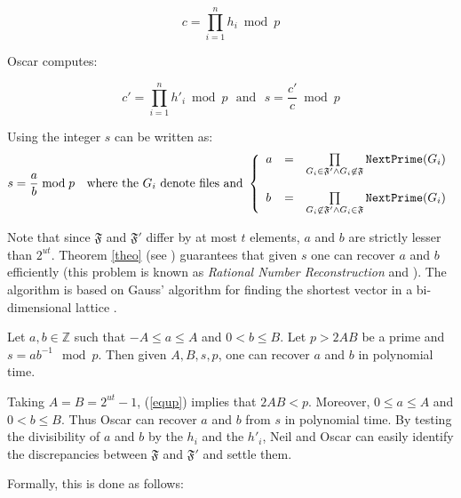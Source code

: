 \documentclass[11pt]{llncs}
\begin{document}
$$
c=\prod_{i=1}^n h_i \bmod p
$$

Oscar computes:\smallskip

$$c'=\prod_{i=1}^n h'_i \bmod p{~~~\mbox{and}~~~}s=\frac{c'}{c} \bmod p$$

Using \cite{vallee} the integer $s$ can be written as:
$$s=\frac{a}{b} \bmod p{~~~\mbox{where the~}G_i\mbox{~denote files and~}}
\left\{
\begin{array}{lcr}
a & =&  \prod\limits_{G_i \in \mathfrak{F}'\wedge G_i \not\in\mathfrak{F}} \mbox{{\tt NextPrime}}(G_i) \\
\\
b & = & \prod\limits_{G_i \not\in\mathfrak{F}' \wedge G_i \in\mathfrak{F}} \mbox{{\tt NextPrime}}(G_i)
\end{array}
\right.
$$

Note that since $\mathfrak{F}$ and $\mathfrak{F}'$ differ by at most $t$ elements, $a$ and $b$ are strictly lesser than $2^{ut}$. Theorem \ref{theo} (see \cite{cryptorational}) guarantees that given $s$ one can recover $a$ and $b$ efficiently (this problem is known as {\sl Rational Number Reconstruction} \cite{pan2004rational} and \cite{wang2003acceleration}). The algorithm is based on Gauss' algorithm for finding the shortest vector in a bi-dimensional lattice \cite{vallee}.

\begin{theorem}
\label{theo}
Let $a,b \in {\mathbb Z}$ such that $-A \leq a \leq A$ and $0<b \leq B$. Let $p>2AB$ be a prime and $s=a b^{-1} \mod p$.
Then given $A,B,s,p$, one can recover $a$ and $b$ in polynomial time.
\end{theorem}

Taking $A=B=2^{ut}-1$, (\ref{equp}) implies that $2AB<p$. Moreover, $0 \leq a \leq A$ and $0 <b \leq B$. Thus Oscar can
recover $a$ and $b$ from $s$ in polynomial time. By testing the divisibility of $a$ and $b$ by the $h_i$ and the $h'_i$, Neil and Oscar can
easily identify the discrepancies between $\mathfrak{F}$ and $\mathfrak{F}'$ and settle them.\smallskip

Formally, this is done as follows:\smallskip
\end{document}
